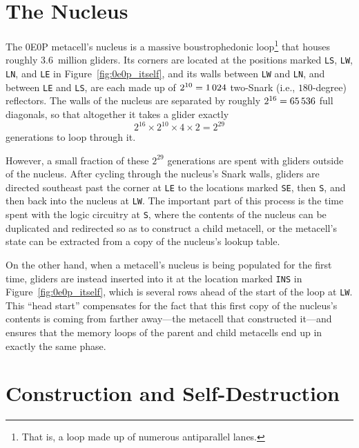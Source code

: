 \section{The Nucleus}\label{sec:0e0p_structure_nucleus}

The 0E0P metacell's nucleus is a massive boustrophedonic loop\footnote{That is, a loop made up of numerous antiparallel lanes.} that houses roughly $3.6$~million gliders. Its corners are located at the positions marked \texttt{LS}, \texttt{LW}, \texttt{LN}, and \texttt{LE} in Figure~\ref{fig:0e0p_itself}, and its walls between \texttt{LW} and \texttt{LN}, and between \texttt{LE} and \texttt{LS}, are each made up of $2^{10} = 1{\,}024$ two-Snark (i.e., $180$-degree) reflectors. The walls of the nucleus are separated by roughly $2^{16} = 65{\,}536$ full diagonals, so that altogether it takes a glider exactly
\[
	2^{16} \times 2^{10} \times 4 \times 2 = 2^{29}
\]
generations to loop through it.

However, a small fraction of these $2^{29}$ generations are spent with gliders outside of the nucleus. After cycling through the nucleus's Snark walls, gliders are directed southeast past the corner at \texttt{LE} to the locations marked \texttt{SE}, then \texttt{S}, and then back into the nucleus at \texttt{LW}. The important part of this process is the time spent with the logic circuitry at \texttt{S}, where the contents of the nucleus can be duplicated and redirected so as to construct a child metacell, or the metacell's state can be extracted from a copy of the nucleus's lookup table.

On the other hand, when a metacell's nucleus is being populated for the first time, gliders are instead inserted into it at the location marked \texttt{INS} in Figure~\ref{fig:0e0p_itself}, which is several rows ahead of the start of the loop at \texttt{LW}. This ``head start'' compensates for the fact that this first copy of the nucleus's contents is coming from farther away---the metacell that constructed it---and ensures that the memory loops of the parent and child metacells end up in exactly the same phase.


\section{Construction and Self-Destruction}\label{sec:0e0p_construction}

